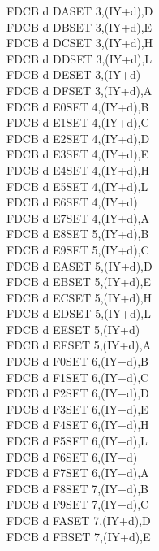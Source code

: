 \begin{multicols}{3}
{\begin{tabbing}
    FDCB d DA\>SET 3,(IY+d),D\UNDOC\\
    FDCB d DB\>SET 3,(IY+d),E\UNDOC\\
    FDCB d DC\>SET 3,(IY+d),H\UNDOC\\
    FDCB d DD\>SET 3,(IY+d),L\UNDOC\\
    FDCB d DE\>SET 3,(IY+d)\\
    FDCB d DF\>SET 3,(IY+d),A\UNDOC\\
    FDCB d E0\>SET 4,(IY+d),B\UNDOC\\
    FDCB d E1\>SET 4,(IY+d),C\UNDOC\\
    FDCB d E2\>SET 4,(IY+d),D\UNDOC\\
    FDCB d E3\>SET 4,(IY+d),E\UNDOC\\
    FDCB d E4\>SET 4,(IY+d),H\UNDOC\\
    FDCB d E5\>SET 4,(IY+d),L\UNDOC\\
    FDCB d E6\>SET 4,(IY+d)\\
    FDCB d E7\>SET 4,(IY+d),A\UNDOC\\
    FDCB d E8\>SET 5,(IY+d),B\UNDOC\\
    FDCB d E9\>SET 5,(IY+d),C\UNDOC\\
    FDCB d EA\>SET 5,(IY+d),D\UNDOC\\
    FDCB d EB\>SET 5,(IY+d),E\UNDOC\\
    FDCB d EC\>SET 5,(IY+d),H\UNDOC\\
    FDCB d ED\>SET 5,(IY+d),L\UNDOC\\
    FDCB d EE\>SET 5,(IY+d)\\
    FDCB d EF\>SET 5,(IY+d),A\UNDOC\\
    FDCB d F0\>SET 6,(IY+d),B\UNDOC\\
    FDCB d F1\>SET 6,(IY+d),C\UNDOC\\
    FDCB d F2\>SET 6,(IY+d),D\UNDOC\\
    FDCB d F3\>SET 6,(IY+d),E\UNDOC\\
    FDCB d F4\>SET 6,(IY+d),H\UNDOC\\
    FDCB d F5\>SET 6,(IY+d),L\UNDOC\\
    FDCB d F6\>SET 6,(IY+d)\\
    FDCB d F7\>SET 6,(IY+d),A\UNDOC\\
    FDCB d F8\>SET 7,(IY+d),B\UNDOC\\
    FDCB d F9\>SET 7,(IY+d),C\UNDOC\\
    FDCB d FA\>SET 7,(IY+d),D\UNDOC\\
    FDCB d FB\>SET 7,(IY+d),E\UNDOC\\

\end{tabbing}}
\end{multicols}
